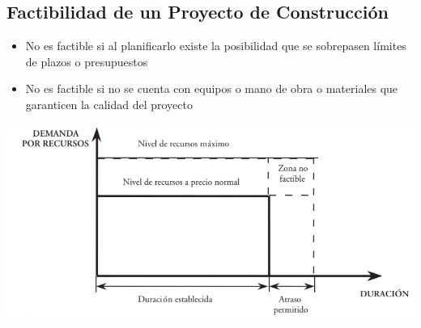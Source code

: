 \documentclass{article} %
\begin{document}
\subsection{Factibilidad de un Proyecto de Construcción}
\begin{minipage}{0.45\textwidth}
    \begin{itemize}
        \item No es factible si al planificarlo existe la posibilidad que se sobrepasen límites de plazos o presupuestos
        \item No es factible si no se cuenta con equipos o mano de obra o materiales que garanticen la calidad del proyecto
    \end{itemize}
\end{minipage}
\hfill
\begin{minipage}{0.5\textwidth}
    \centering
    \includegraphics[width=1.2\textwidth]{factibilidad_proyecto.png}
\end{minipage}
\end{document}

